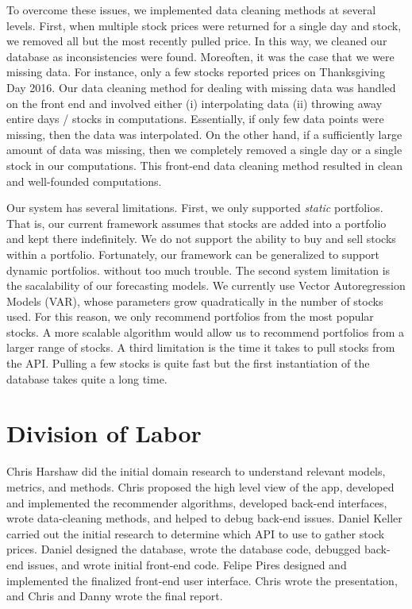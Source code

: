 \documentclass{article}
\begin{document}
To overcome these issues, we implemented data cleaning methods at several levels. First, when multiple stock prices were returned for a single day and stock, we removed all but the most recently pulled price. In this way, we cleaned our database as inconsistencies were found. Moreoften, it was the case that we were missing data. For instance, only a few stocks reported prices on Thanksgiving Day 2016. Our data cleaning method for dealing with missing data was handled on the front end and involved either (i) interpolating data (ii) throwing away entire days / stocks in computations. Essentially, if only few data points were missing, then the data was interpolated. On the other hand, if a sufficiently large amount of data was missing, then we completely removed a single day or a single stock in our computations. This front-end data cleaning method resulted in clean and well-founded computations.

Our system has several limitations. First, we only supported \emph{static} portfolios. That is, our current framework assumes that stocks are added into a portfolio and kept there indefinitely. We do not support the ability to buy and sell stocks within a portfolio. Fortunately, our framework can be generalized to support dynamic portfolios. without too much trouble. The second system limitation is the sacalability of our forecasting models. We currently use Vector Autoregression Models (VAR), whose parameters grow quadratically in the number of stocks used. For this reason, we only recommend portfolios from the most popular stocks. A more scalable algorithm would allow us to recommend portfolios from a larger range of stocks. A third limitation is the time it takes to pull stocks from the API. Pulling a few stocks is quite fast but the first instantiation of the database takes quite a long time.

\section{Division of Labor} \label{sec:division}
Chris Harshaw did the initial domain research to understand relevant models, metrics, and methods. Chris proposed the high level view of the app, developed and implemented the recommender algorithms, developed back-end interfaces, wrote data-cleaning methods, and helped to debug back-end issues.  Daniel Keller carried out the initial research to determine which API to use to gather stock prices. Daniel designed the database, wrote the database code, debugged back-end issues, and wrote initial front-end code. Felipe Pires designed and implemented the finalized front-end user interface. Chris wrote the presentation, and Chris and Danny wrote the final report.
\end{document}
